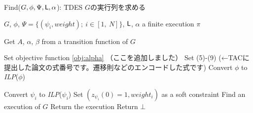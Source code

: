 \documentclass[ 10pt]{jsarticle}
\newcommand{\req}[1]{\eqref{#1}}
\newcommand{\Len}{{\sf L}}
\begin{document}
\begin{algorithm}
\caption{Find($G,\phi,\Psi,\Len,\alpha$): TDES $G$の実行列を求める} \label{alg_solve_maxsat}
\begin{algorithmic}
%
\Require $G$, $\phi$, $\Psi=\{(\psi_i,weight);\ i\in[1,\ N]\}$, $\Len$, $\alpha$
\Ensure a finite execution $\pi$ 

\State Get $A$, $\alpha$, $\beta$ from a transition function of $G$

\State Set objective function \req{obj:alpha} （ここを追加しました）
\State Set (5)-(9) (←TACに提出した論文の式番号です。遷移則などのエンコードした式です)%
\State Convert $\phi$ to \textit{ILP}($\phi$)

	\State Convert $\psi_{i}$ to \textit{ILP}($\psi_{i}$) 
	\State Set $(z_{\psi_i}(0)=1,weight_i)$ as a soft constraint
	\EndFor
\EndIf
\State Find an execution of $G$
	\State Return the execution 
\Else
	\State  Return $\bot$
\EndIf
\end{algorithmic}
\end{algorithm}
\begin{comment}
\section{具体例の案}
前回のミーティングで発案された具体例について定式化します。

上位TDESは平面をグリッド状に区切ったものを表現し、
下位TDESはその位置・場所に対応付けられたタスクを表現すると想定している。
上位TDESの状態（場所）$s_i$には、下位TDESで表現されたタスクが存在していることを表す。

$M'$を$1\leq M'\leq M$を満たす整数とする。
$i_h\in\{1,\ldots, M'\}$について、$s_{i_h}$で行うタスクは必ずどこかのタイミングで完了しなければならないとする。
$i_s\in\{M'+1,\ldots, M\}$について、$s_{i_s}$で行うタスクは可能ならば実行するとする。
そうすると、$G$に与えるHard制約とSoft制約は、パラメーター$m_i\in \mathbb{Z}_{\geq 0},i\in\{1,\ldots,M\}$を用いて以下のように与えられる。
\begin{align}
\phi(\bm{m})=&\bigwedge_{i_h=1}^{M'}\Diamond_{[0,\Len]}\Box_{[0,m_{i_h}]}L(s_{i_h}) \land \phi',\\
\Psi(\bm{m})=&\left\{\Diamond_{[0,\Len]}\Box_{[0,m_{i_s}]}L(s_{i_s})|\ i_s\in\left\{M'+1,\ldots, M\right\}\right\}\cup \Psi'.
\end{align}
ここで、$L$は$G$のラベル関数、$\phi'$はHard制約の一部を表すticked LTL${}_f$式、$\Psi'$はSoft制約の一部とその重みのタプルの集合を表す集合とする。
%
%
%
\end{comment}
%
%

% 
\end{document}
